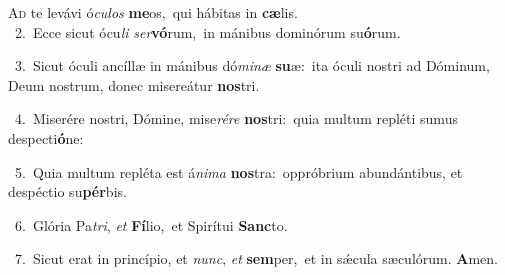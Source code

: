 \lettrine{\initial\textcolor{\initialcolor}{A}}{d} te levávi ó\-\textit{cu}\-\textit{los} \textbf{me}\-os,~\star qui hábitas in \textbf{cæ}\-lis.\\
{\numbfont\textcolor{\numbcolor}{~2.}}~Ecce sicut ócu\textit{li} \textit{ser}\-\textbf{vó}rum,~\star in mánibus dominórum su\-\textbf{ó}\-rum.\par
{\numbfont\textcolor{\numbcolor}{~3.}}~Sicut óculi ancíllæ in mánibus dó\-\textit{mi}\-\textit{næ} \textbf{su}\-æ:~\star ita óculi nostri ad Dóminum, Deum nostrum, donec misereátur \textbf{nos}\-tri.\par
{\numbfont\textcolor{\numbcolor}{~4.}}~Miserére nostri, Dómine, mise\-\textit{ré}\-\textit{re} \textbf{nos}\-tri:~\star quia multum repléti sumus despecti\-\textbf{ó}\-ne:\par
{\numbfont\textcolor{\numbcolor}{~5.}}~Quia multum repléta est á\-\textit{ni}\-\textit{ma} \textbf{nos}\-tra:~\star oppróbrium abundántibus, et despéctio su\-\textbf{pér}\-bis.\par
{\numbfont\textcolor{\numbcolor}{~6.}}~Glória Pa\-\textit{tri}\-, \textit{et} \textbf{Fí}\-lio,~\star et Spirítui \textbf{Sanc}\-to.\par
{\numbfont\textcolor{\numbcolor}{~7.}}~Sicut erat in princípio, et \textit{nunc}\-, \textit{et} \textbf{sem}\-per,~\star et in sǽcula sæculórum. \textbf{A}\-men.\par
